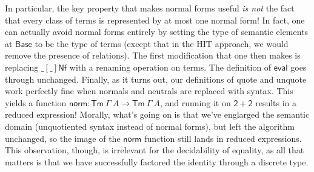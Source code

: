 In particular, the key property that makes normal forms useful \emph{is not} the
fact that every class of terms is represented by at most one normal form! In
fact, one can actually avoid normal forms entirely by setting the type of
semantic elements at $\mathsf{Base}$ to be the type of terms (except that in
the HIT approach, we would remove the presence of relations). The first
modification that one then makes is replacing $\mathsf{\_[\_]Nf}$ with a renaming
operation on terms. The definition of $\mathsf{eval}$ goes through unchanged.
Finally, as it turns out, our definitions of quote and unquote work perfectly
fine when normals and neutrals are replaced with syntax. This yields a function
$\mathsf{norm} : \mathsf{Tm}~\Gamma~A \to \mathsf{Tm}~\Gamma~A$, and running
it on $\mathsf{2+2}$ results in a reduced expression! Morally, what's going on
is that we've englarged the semantic domain (unquotiented syntax instead of
normal forms), but left the algorithm unchanged, so the image of the
$\mathsf{norm}$ function still lands in reduced expressions. This observation,
though, is irrelevant for the decidability of equality, as all that matters is
that we have successfully factored the identity through a discrete type.
